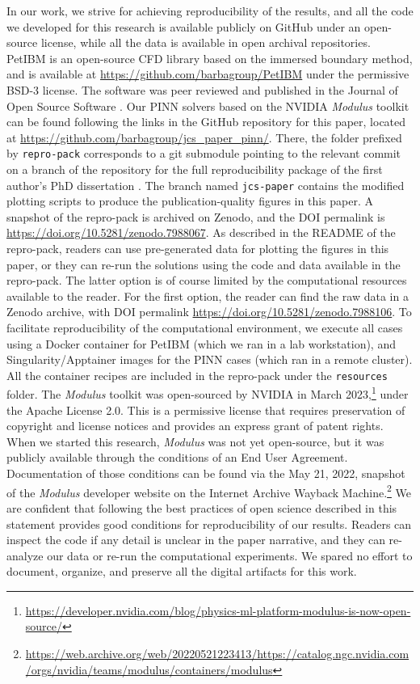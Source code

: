 
In our work, we strive for achieving reproducibility of the results, and all the code we developed for this research is available publicly on GitHub under an open-source license, while all the data is available in open archival repositories.
PetIBM is an open-source CFD library based on the immersed boundary method, and is available at \url{https://github.com/barbagroup/PetIBM} under the permissive BSD-3 license. 
The software was peer reviewed and published in the Journal of Open Source Software \cite{chuang_petibm_2018}. 
Our PINN solvers based on the NVIDIA \emph{Modulus} toolkit can be found following the links in the GitHub repository for this paper, located at \url{https://github.com/barbagroup/jcs_paper_pinn/}. 
There, the folder prefixed by \texttt{repro-pack} corresponds to a git submodule pointing to the relevant commit on a branch of the repository for the full reproducibility package of the first author's PhD dissertation \cite{chuang_thesis_2023}.
The branch named \texttt{jcs-paper} contains the modified plotting scripts to produce the publication-quality figures in this paper.    
A snapshot of the repro-pack is archived on Zenodo, and the DOI permalink is \url{https://doi.org/10.5281/zenodo.7988067}.
As described in the README of the repro-pack, readers can use pre-generated data for plotting the figures in this paper, or they can re-run the solutions using the code and data available in the repro-pack.
The latter option is of course limited by the computational resources available to the reader.
For the first option, the reader can find the raw data in a Zenodo archive, with DOI permalink \url{https://doi.org/10.5281/zenodo.7988106}.
To facilitate reproducibility of the computational environment, we execute all cases using a Docker container for PetIBM (which we ran in a lab workstation), and Singularity/Apptainer images for the PINN cases (which ran in a remote cluster). 
All the container recipes are included in the repro-pack under the \texttt{resources} folder. 
The \emph{Modulus} toolkit was open-sourced by NVIDIA in March 2023,\footnote{\url{https://developer.nvidia.com/blog/physics-ml-platform-modulus-is-now-open-source/}} under the Apache License 2.0.
This is a permissive license that requires preservation of copyright and license notices and provides an express grant of patent rights. 
When we started this research, \emph{Modulus} was not yet open-source, but it was publicly available through the conditions of an End User Agreement. 
Documentation of those conditions can be found via the May 21, 2022, snapshot of the \emph{Modulus} developer website on the Internet Archive Wayback Machine.\footnote{\url{https://web.archive.org/web/20220521223413/https://catalog.ngc.nvidia.com/orgs/nvidia/teams/modulus/containers/modulus}}
We are confident that following the best practices of open science described in this statement provides good conditions for reproducibility of our results. 
Readers can inspect the code if any detail is unclear in the paper narrative, and they can re-analyze our data or re-run the computational experiments.
We spared no effort to document, organize, and preserve all the digital artifacts for this work.